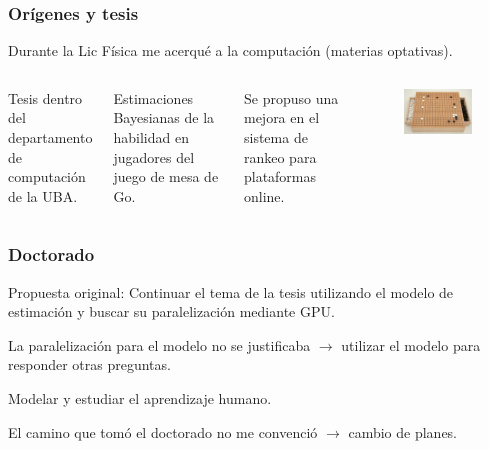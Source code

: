 \documentclass[handout]{beamer}
\begin{document}
\begin{frame}
\frametitle{Orígenes y tesis}

 Durante la Lic Física me acerqué a la computación (materias optativas).
\begin{columns}
\vspace{0.5cm}

Tesis dentro del departamento de computación de la UBA.
\vspace{0.5cm}

Estimaciones Bayesianas de la habilidad en jugadores del juego de mesa de Go.

\vspace{0.5cm}
Se propuso una mejora en el sistema de rankeo para plataformas online.
\begin{figure}[h!]
    \centering
    \includegraphics[scale=2.]{go.jpg}
\end{figure}
\end{columns}
\end{frame}

\begin{frame}
\frametitle{Doctorado}
Propuesta original: Continuar el tema de la tesis utilizando el modelo de estimación y buscar su paralelización mediante GPU.

La paralelización para el modelo no se justificaba $\rightarrow$ utilizar el modelo para responder otras preguntas.

Modelar y estudiar el aprendizaje humano.

El camino que tomó el doctorado  no me convenció $\to$ cambio de planes.



\end{frame}
\end{document}
